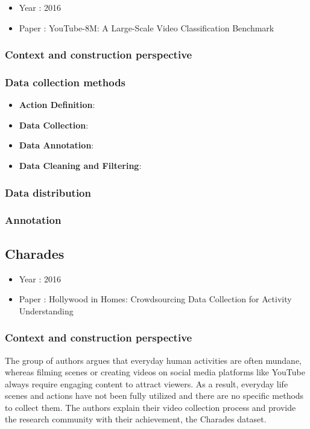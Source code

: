 \documentclass[10pt,onecolumn,letterpaper]{article}
\begin{document}
\begin{itemize}
	\item Year : 2016
	\item Paper : YouTube-8M: A Large-Scale Video Classification Benchmark \cite{YouTube8M}
\end{itemize}

\subsubsection{Context and construction perspective}
\subsubsection{Data collection methods}
\begin{itemize}
	\item \textbf{Action Definition}:
	\item \textbf{Data Collection}:
	\item \textbf{Data Annotation}:
	\item \textbf{Data Cleaning and Filtering}:
\end{itemize}
\subsubsection{Data distribution}
\subsubsection{Annotation}

\subsection{Charades}

\begin{itemize}
	\item Year : 2016
	\item Paper : Hollywood in Homes: Crowdsourcing Data Collection for Activity Understanding \cite{Charades}
\end{itemize}

\subsubsection{Context and construction perspective}
The group of authors argues that everyday human activities are often mundane, whereas filming scenes or creating videos on social media platforms like YouTube always require engaging content to attract viewers. As a result, everyday life scenes and actions have not been fully utilized and there are no specific methods to collect them. The authors explain their video collection process and provide the research community with their achievement, the Charades dataset.
\end{document}

